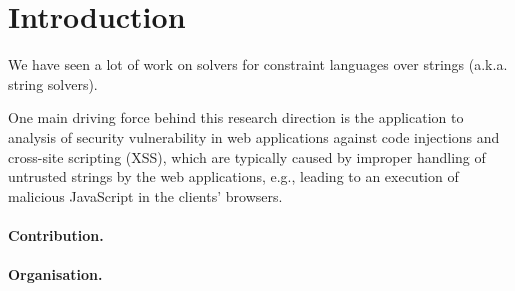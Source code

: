 \section{Introduction}

We have seen  a lot of work on solvers for constraint languages over strings (a.k.a. string solvers). 

One main driving force behind this research direction is the application to analysis of security vulnerability in web applications against code injections and cross-site scripting (XSS), which are typically caused by improper handling of untrusted strings by the web applications, e.g., leading to an execution of malicious JavaScript in the clients' browsers. 

\paragraph{Contribution.}

\paragraph{Organisation.}

\cite{LB16,TCJ16,YABI14}